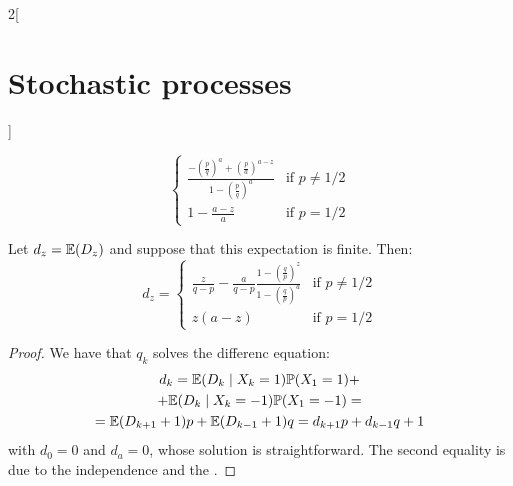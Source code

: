 \documentclass[../../../main_math.tex]{subfiles}
\begin{document}
\begin{multicols}{2}[\section{Stochastic processes}]
\begin{sproof}
$$\begin{cases}
        \frac{-{\left(\frac{p}{q}\right)}^a+{\left(\frac{p}{a}\right)}^{a-z}}{1-{\left(\frac{p}{q}\right)}^a} & \text{if $p\ne 1/2$} \\
        1-\frac{a-z}{a}                                                                                       & \text{if $p= 1/2$}
      \end{cases}$$
  \end{sproof}
  \begin{proposition}
    Let $d_z=\mathbb{E}(D_z)$ and suppose that this expectation is finite. Then:
    $$
      d_z=\begin{cases}
        \frac{z}{q-p}-\frac{a}{q-p}\frac{1-{\left(\frac{q}{p}\right)}^z}{1-{\left(\frac{q}{p}\right)}^a} & \text{if $p\ne 1/2$} \\
        z(a-z)                                                                                           & \text{if $p= 1/2$}
      \end{cases}
    $$
  \end{proposition}
  \begin{proof}
    We have that $q_k$ solves the differenc equation:
    \begin{multline*}
      d_k =\mathbb{E}(D_k\mid X_k=1)\mathbb{P}(X_1=1)+\\
      +\mathbb{E}(D_k\mid X_k=-1)\mathbb{P}(X_1=-1) =\\=\mathbb{E}(D_{k+1}+1)p+\mathbb{E}(D_{k-1}+1)q= d_{k+1}p+d_{k-1}q+1
    \end{multline*}
    with $d_0=0$ and $d_a=0$, whose solution is straightforward. The second equality is due to the independence and the .
  \end{proof}

\end{multicols}
\end{document}
